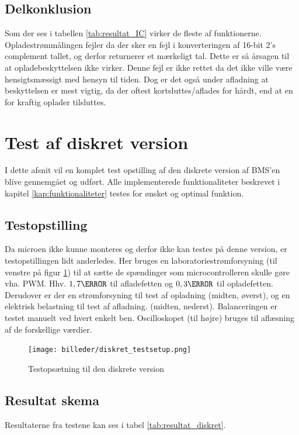 \subsection{Delkonklusion}
Som der ses i tabellen \ref{tab:resultat_IC} virker de fleste af funktionerne. Opladestrømmålingen fejler da der sker en fejl i konverteringen af 16-bit 2's complement tallet, og derfor returnerer et mærkeligt tal. Dette er så årsagen til at opladebeskyttelsen ikke virker. Denne fejl er ikke rettet da det ikke ville være hensigtsmæssigt med hensyn til tiden. Dog er det også under afladning at beskyttelsen er mest vigtig, da der oftest kortsluttes/aflades for hårdt, end at en for kraftig oplader tilsluttes.

\section{Test af diskret version}\label{afs:test_diskret}
I dette afsnit vil en komplet test opstilling af den diskrete version af BMS'en blive gennemgået og udført. Alle implementerede funktionaliteter beskrevet i kapitel \ref{kap:funktionaliteter} testes for ønsket og optimal funktion. 

\subsection{Testopstilling}
Da microen ikke kunne monteres og derfor ikke kan testes på denne version, er testopstillingen lidt anderledes. Her bruges en laboratoriestrømforsyning (til venstre på figur \ref{fig:diskret_testsetup}) til at sætte de spændinger som microcontrolleren skulle gøre vha. PWM. Hhv. $1,7\volt$ til afladefetten og $0,3\volt$ til opladefetten. Derudover er der en strømforsyning til test af opladning (midten, øverst), og en elektrisk belastning til test af afladning. (midten, nederst). Balanceringen er testet manuelt ved hvert enkelt ben. Oscilloskopet (til højre) bruges til aflæsning af de forskellige værdier. 

\begin{figure}[h]
	\centering
	\texttt{[image: billeder/diskret\_testsetup.png]}
	\caption{Testopsætning til den diskrete version}
	\label{fig:diskret_testsetup}
\end{figure}

\subsection{Resultat skema}
Resultaterne fra testene kan ses i tabel \ref{tab:resultat_diskret}.

